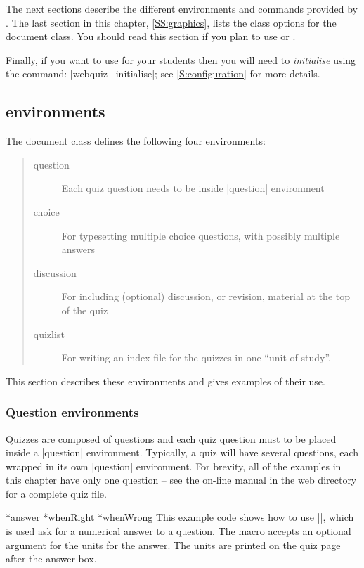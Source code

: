 \documentclass[svgnames]{article}
\makeatletter
\newcommand\macroIndex[1]{%
  \lowercase{\def\temp{#1}}%
  \expandafter\index\expandafter{\temp@\textbackslash#1}%
}
\newcommand\gobbleone[1]{}%
\newcommand\SeeIndex[2]{\index{#1!zzzz@\protect\gobbleone|See{#2}}}
\makeatother
\begin{document}
  The next sections describe the different environments and commands
  provided by \WebQuiz. The last section in this chapter,
  \autoref{SS:graphics}, lists the class options for the \WebQuiz
  document class. You should read this section if you plan to use
   or .

  Finally, if you want to use \WebQuiz for your students then you will
  need to \textit{initialise} \WebQuiz using the command:
  \BashCode|webquiz --initialise|; see \autoref{S:configuration} for more
  details.

\subsection{\WebQuiz environments}

The \WebQuiz document class defines the following four environments:
\begin{quote}
  \begin{description}
    \item[question] Each quiz question needs to be inside
    \LatexCode|question| environment
    \item[choice] For typesetting multiple choice questions, with
    possibly multiple answers
    \item[discussion] For including (optional) discussion, or revision,
    material at the top of the quiz
    \item[quizlist] For writing an index file for the quizzes in
    one ``unit of study''.
  \end{description}
\end{quote}
This section describes these environments and gives examples
of their use.

\subsubsection{Question environments}

Quizzes are composed of questions and each quiz question must to be
placed inside a \LatexCode|question| environment. Typically, a quiz will have
several questions, each wrapped in its own \LatexCode|question| environment.
For brevity, all of the examples in this chapter have only one question
-- see the on-line manual in the \WebQuiz web directory for a complete quiz file.

  \macroIndex{answer}*{answer}
  *{whenRight}
  *{whenWrong}
  \SeeIndex{numeric answer}{\textbackslash answer}
  This example code shows how to use \LatexCode|\answer|, which is used
  ask for a numerical answer to a question. The  \LatexCode{\answer}
  macro accepts an optional argument for the units for the answer. The
  units are printed on the quiz page after the answer box.
\end{document}
